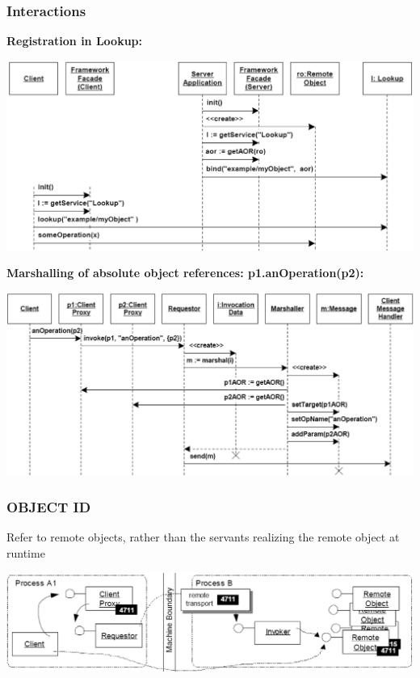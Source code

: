 \documentclass[10pt]{article}
\begin{document}
\subsubsection{Interactions}
\textbf{Registration in Lookup:}
\begin{center}
	\includegraphics[scale=0.3]{images/interactions-registration.png}
\end{center}
\textbf{Marshalling of absolute object references: p1.anOperation(p2):}
\begin{center}
	\includegraphics[scale=0.2]{images/interactions-marshalling.png}
\end{center}
\subsubsection{OBJECT ID}
Refer to remote objects, rather than the servants realizing the remote
object at runtime
\begin{center}
	\includegraphics[scale=0.2]{images/objectId.png}
\end{center}
\end{document}
